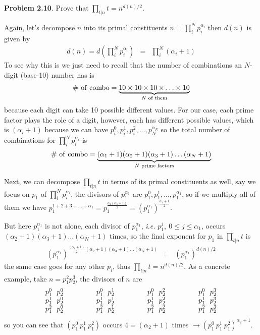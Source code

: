 \documentclass[aps,preprint,preprintnumbers,nofootinbib,showpacs,prd]{revtex4-1}
\newcommand{\ie}{{\it i.e.} }
\newcommand{\nbea}{\begin{eqnarray*}}
\newcommand{\neea}{\end{eqnarray*}}
\begin{document}
{\bf Problem 2.10}. Prove that $\prod_{t|n} t = n^{d(n)/2}$.

Again, let's decompose $n$ into its primal constituents $n = \prod_i^N p_i^{\alpha_i}$ then $d(n)$ is given by
%
\nbea
d(n) = d\left(\prod_i^N p_i^{\alpha_i}\right) & = & \prod_i^N (\alpha_i + 1)
\neea
%
To see why this is we just need to recall that the number of combinations an $N$-digit (base-10) number has is 
%
\nbea
\# {\rm~of~combo} = \underbrace{10 \times 10 \times 10 \times \ldots \times 10}_\text{$N$ {\rm of~them}}
\neea
%
because each digit can take 10 possible different values. For our case, each prime factor plays the role of a digit, however, each has different possible values, which is $(\alpha_i+1)$ because we can have $p_i^0,p_i^1,p_i^2,\ldots,p_N^{\alpha_N}$ so the total number of combinations for $\prod_i^N p_i^{\alpha_i}$ is
%
\nbea
\# {\rm~of~combo} = \underbrace{(\alpha_1 + 1) (\alpha_2 + 1) (\alpha_3 + 1) \ldots (\alpha_N + 1)}_\text{$N$ {\rm prime~factors}}
\neea
%

Next, we can decompose $\prod_{t|n} t$ in terms of its primal constituents as well, say we focus on $p_1$ of $\prod_i^N p_i^{\alpha_i}$, the divisors of $p_1^{\alpha_1}$ are $p_1^0, p_1^1, \ldots, p_1^{\alpha_1}$, so if we multiply all of them we have $p_1^{1 + 2 + 3 + \ldots + \alpha_1} = p_1^{\frac{\alpha_1(\alpha_1 + 1)}{2}} = \left ( p_1^{\alpha_1}\right )^{\frac{\alpha_1+1}{2}}$.

But here $p_1^{\alpha_1}$ is not alone, each divisor of $p_1^{\alpha_1}$, \ie $p_1^{j}, ~0 \le j \le \alpha_1$, occurs $(\alpha_2+1)(\alpha_3+1)\ldots(\alpha_N+1)$ times, so the final exponent for $p_1$ in $\prod_{t|n} t$ is
%
\nbea
\left (p_1^{\alpha_1}\right )^{\frac{(\alpha_1+1)}{2}(\alpha_2+1)(\alpha_3+1)\ldots(\alpha_N+1)} & = & \left (p_1^{\alpha_1}\right )^{d(n)/2}
\neea
%
the same case goes for any other $p_i$, thus $\prod_{t|n}t = n^{d(n)/2}$. As a concrete example, take $n = p_1^2p_2^3$, the divisors of $n$ are
%
\nbea
\begin{array}{c c c c c c c}
p_1^0 ~~ p_2^0 & ~~~~~~~~ & p_1^0 ~~ p_2^1 & ~~~~~~~~ & p_1^0 ~~ p_2^2 & ~~~~~~~~ & p_1^0 ~~ p_2^3 \\
p_1^1 ~~ p_2^0 & ~~~~~~~~ & p_1^1 ~~ p_2^1 & ~~~~~~~~ & p_1^1 ~~ p_2^2 & ~~~~~~~~ & p_1^1 ~~ p_2^3 \\
p_1^2 ~~ p_2^0 & ~~~~~~~~ & p_1^2 ~~ p_2^1 & ~~~~~~~~ & p_1^2 ~~ p_2^2 & ~~~~~~~~ & p_1^2 ~~ p_2^3
\end{array}
\neea
%
so you can see that $(p_1^0~p_1^1~p_1^2)$ occurs $4=(\alpha_2+1)$ times $\to (p_1^0~p_1^1~p_1^2)^{\alpha_2+1}$.
\end{document}
